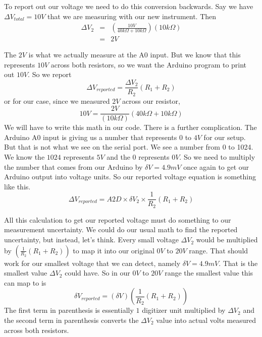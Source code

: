 To report out our voltage we need to do this conversion backwards. Say we
have $\Delta V_{total}=10\unit{V}$ that we are measuring with our new
instrument. Then 
\begin{eqnarray*}
\Delta V_{2} &=&\left( \frac{10\unit{V}}{40\unit{k%
\Omega%
}+10\unit{k%
\Omega%
}}\right) \left( 10\unit{k%
\Omega%
}\right) \\
&=&2\unit{V}
\end{eqnarray*}

The $2\unit{V}$ is what we actually measure at the A0 input. But we know
that this represents $10\unit{V}$ across both resistors, so we want the
Arduino program to print out $10\unit{V}.$ So we report%
\begin{equation*}
\Delta V_{reported}=\frac{\Delta V_{2}}{R_{2}}\left( R_{1}+R_{2}\right)
\end{equation*}%
or for our case, since we measured $2\unit{V}$ across our resistor,%
\begin{equation*}
10\unit{V}=\frac{2\unit{V}}{\left( 10\unit{k%
\Omega%
}\right) }\left( 40\unit{k%
\Omega%
}+10\unit{k%
\Omega%
}\right)
\end{equation*}%
We will have to write this math in our code. There is a further
complication. The Arduino A0 input is giving us a number that represents $0$
to $4\unit{V}$ for our setup. But that is not what we see on the serial
port. We see a number from 0 to 1024. We know the $1024$ represents $5\unit{V%
}$ and the $0$ represents $0\unit{V}.$ So we need to multiply the number
that comes from our Arduino by $\delta V=4.9\unit{mV}$ once again to get our
Arduino output into voltage units. So our reported voltage equation is
something like this. 
\begin{equation*}
\Delta V_{reported}=A2D\times \delta V_{2}\times \frac{1}{R_{2}}\left(
R_{1}+R_{2}\right)
\end{equation*}

All this calculation to get our reported voltage must do something to our
measurement uncertainty. We could do our usual math to find the reported
uncertainty, but instead, let's think. Every small voltage $\Delta V_{2}$
would be multiplied by $\left( \frac{1}{R_{2}}\left( R_{1}+R_{2}\right)
\right) $ to map it into our original $0\unit{V}$ to $20\unit{V}$ range.
That should work for our smallest voltage that we can detect, namely $\delta
V=4.9\unit{mV}.$ That is the smallest value $\Delta V_{2}$ could have. So in
our $0\unit{V}$ to $20\unit{V}$ range the smallest value this can map to is 
\begin{equation*}
\delta V_{reported}=\left( \delta V\right) \left( \frac{1}{R_{2}}\left(
R_{1}+R_{2}\right) \right)
\end{equation*}%
The first term in parenthesis is essentially $1$ digitizer unit multiplied
by $\Delta V_{2}$ and the second term in parenthesis converts the $\Delta
V_{2}$ value into actual volts measured across both resistors.


